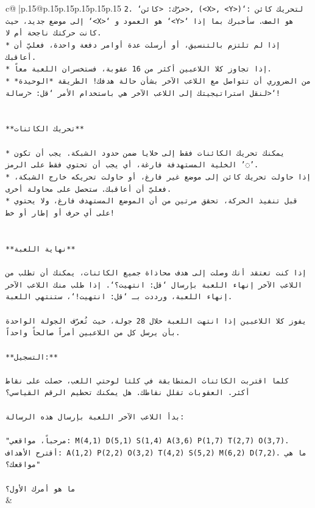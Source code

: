 \documentclass{article}
\begin{document}
{\begin{supertabular}{c@{$\;$}|p{.15\linewidth}@{}p{.15\linewidth}p{.15\linewidth}p{.15\linewidth}p{.15\linewidth}p{.15\linewidth}}
{{{\texttt{2. `حرّك: <كائن>, (<X>, <Y>)`: لتحريك كائن إلى موضع جديد، حيث `<X>` هو العمود و `<Y>` هو الصف. سأخبرك بما إذا كانت حركتك ناجحة أم لا.} \\
\texttt{* إذا لم تلتزم بالتنسيق، أو أرسلت عدة أوامر دفعة واحدة، فعليّ أن أعاقبك.} \\
\texttt{* إذا تجاوز كلا اللاعبين أكثر من 16 عقوبة، فستخسران اللعبة معاً.} \\
\texttt{* من الضروري أن تتواصل مع اللاعب الآخر بشأن حالة هدفك! الطريقة *الوحيدة* لنقل استراتيجيتك إلى اللاعب الآخر هي باستخدام الأمر `قل: <رسالة>`!} \\
\\ 
\\ 
\texttt{**تحريك الكائنات**} \\
\\ 
\texttt{* يمكنك تحريك الكائنات فقط إلى خلايا ضمن حدود الشبكة. يجب أن تكون الخلية المستهدفة فارغة، أي يجب أن تحتوي فقط على الرمز '◌'.} \\
\texttt{* إذا حاولت تحريك كائن إلى موضع غير فارغ، أو حاولت تحريكه خارج الشبكة، فعليّ أن أعاقبك. ستحصل على محاولة أخرى.} \\
\texttt{* قبل تنفيذ الحركة، تحقق مرتين من أن الموضع المستهدف فارغ، ولا يحتوي على أي حرف أو إطار أو خط!} \\
\\ 
\\ 
\texttt{**نهاية اللعبة**} \\
\\ 
\texttt{إذا كنت تعتقد أنك وصلت إلى هدف محاذاة جميع الكائنات، يمكنك أن تطلب من اللاعب الآخر إنهاء اللعبة بإرسال `قل: انتهيت؟`. إذا طلب منك اللاعب الآخر إنهاء اللعبة، ورددت بـ `قل: انتهيت!`، ستنتهي اللعبة.} \\
\\ 
\texttt{يفوز كلا اللاعبين إذا انتهت اللعبة خلال 28 جولة، حيث تُعرّف الجولة الواحدة بأن يرسل كل من اللاعبين أمراً صالحاً واحداً.} \\
\\ 
\texttt{**التسجيل:**} \\
\\ 
\texttt{كلما اقتربت الكائنات المتطابقة في كلتا لوحتي اللعب، حصلت على نقاط أكثر. العقوبات تقلل نقاطك. هل يمكنك تحطيم الرقم القياسي؟} \\
\\ 
\texttt{بدأ اللاعب الآخر اللعبة بإرسال هذه الرسالة:} \\
\\ 
\texttt{"مرحباً، مواقعي: M(4,1) D(5,1) S(1,4) A(3,6) P(1,7) T(2,7) O(3,7). أقترح الأهداف: A(1,2) P(2,2) O(3,2) T(4,2) S(5,2) M(6,2) D(7,2). ما هي مواقعك؟"} \\
\\ 
\texttt{ما هو أمرك الأول؟} \\
            }
        }
    }
    & \\ \\


\end{supertabular}}
\end{document}
